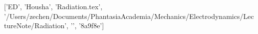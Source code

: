 ['ED', 'Housha', 'Radiation.tex', '/Users/zechen/Documents/PhantasiaAcademia/Mechanics/Electrodynamics/LectureNote/Radiation', '\xba\xbf{}\xbe{}', '\xbe{}\x8a\x9f\x8e']

